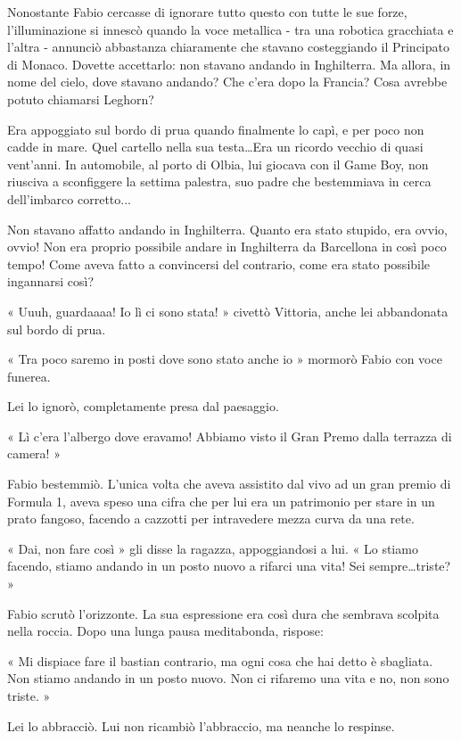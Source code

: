 Nonostante Fabio cercasse di ignorare tutto questo con tutte le sue forze, l'illuminazione si innescò quando la voce metallica - tra una robotica gracchiata e l'altra - annunciò abbastanza chiaramente che stavano costeggiando il Principato di Monaco. Dovette accettarlo: non stavano andando in Inghilterra. Ma allora, in nome del cielo, dove stavano andando? Che c'era dopo la Francia? Cosa avrebbe potuto chiamarsi Leghorn?

Era appoggiato sul bordo di prua quando finalmente lo capì, e per poco non cadde in mare. Quel cartello nella sua testa\ldots Era un ricordo vecchio di quasi vent'anni. In automobile, al porto di Olbia, lui giocava con il Game Boy, non riusciva a sconfiggere la settima palestra, suo padre che bestemmiava in cerca dell'imbarco corretto...

Non stavano affatto andando in Inghilterra. Quanto era stato stupido, era ovvio, ovvio! Non era proprio possibile andare in Inghilterra da Barcellona in così poco tempo! Come aveva fatto a convincersi del contrario, come era stato possibile ingannarsi così?

« Uuuh, guardaaaa! Io lì ci sono stata! » civettò Vittoria, anche lei abbandonata sul bordo di prua.

« Tra poco saremo in posti dove sono stato anche io » mormorò Fabio con voce funerea.

Lei lo ignorò, completamente presa dal paesaggio.

« Lì c'era l'albergo dove eravamo! Abbiamo visto il Gran Premo dalla terrazza di camera! »

Fabio bestemmiò. L'unica volta che aveva assistito dal vivo ad un gran premio di Formula 1, aveva speso una cifra che per lui era un patrimonio per stare in un prato fangoso, facendo a cazzotti per intravedere mezza curva da una rete.

« Dai, non fare così » gli disse la ragazza, appoggiandosi a lui. « Lo stiamo facendo, stiamo andando in un posto nuovo a rifarci una vita! Sei sempre\ldots triste? »

Fabio scrutò l'orizzonte. La sua espressione era così dura che sembrava scolpita nella roccia. Dopo una lunga pausa meditabonda, rispose:

« Mi dispiace fare il bastian contrario, ma ogni cosa che hai detto è sbagliata. Non stiamo andando in un posto nuovo. Non ci rifaremo una vita e no, non sono triste. »

Lei lo abbracciò. Lui non ricambiò l'abbraccio, ma neanche lo respinse.

